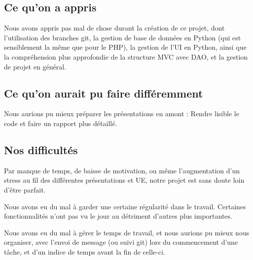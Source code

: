 \documentclass{article}
\begin{document}
\subsection{Ce qu'on a appris}

Nous avons appris pas mal de chose durant la création de ce projet, dont l'utilisation des branches git, la gestion de base de données en Python (qui est sensiblement la même que pour le PHP), la gestion de l'UI en Python, ainsi que la compréhension plus approfondie de la structure MVC avec DAO, et la gestion de projet en général.

\subsection{Ce qu'on aurait pu faire différemment}

Nous aurions pu mieux préparer les présentations en amont : Rendre lisible le code et faire un rapport plus détaillé.

\subsection{Nos difficultés}

Par manque de temps, de baisse de motivation, ou même l'augmentation d'un stress au fil des différentes présentations et UE, notre projet est sans doute loin d'être parfait.

Nous avons eu du mal à garder une certaine régularité dans le travail. Certaines fonctionnalités n'ont pas vu le jour au détriment d'autres plus importantes.

Nous avons eu du mal à gérer le temps de travail, et nous aurions pu mieux nous organiser, avec l'envoi de message (ou suivi git) lors du commencement d'une tâche, et d'un indice de temps avant la fin de celle-ci.
\end{document}
